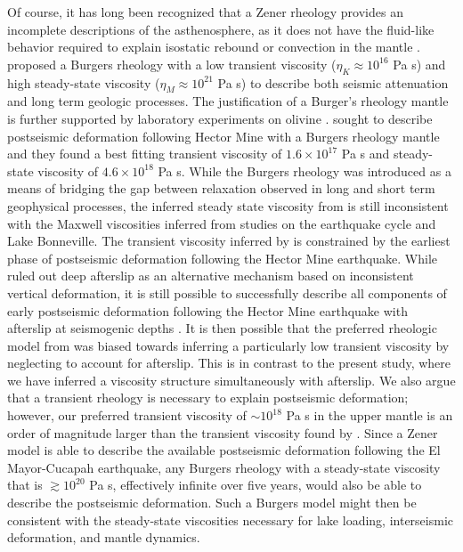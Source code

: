\documentclass[draft,linenumbers]{AGUJournal}
\begin{document}
Of course, it has long been recognized that a Zener rheology provides an incomplete descriptions of the asthenosphere, as it does not have the fluid-like behavior required to explain isostatic rebound or convection in the mantle \citep{OConnell1971}.  \citet{Yuen1982} proposed a Burgers rheology with a low transient viscosity ($\eta_K\approx10^{16}$ Pa s) and high steady-state viscosity ($\eta_M\approx10^{21}$ Pa s) to describe both seismic attenuation and long term geologic processes.  The justification of a Burger's rheology mantle is further supported by laboratory experiments on olivine \citep{Chopra1997}.  \citet{Pollitz2003} sought to describe postseismic deformation following Hector Mine with a Burgers rheology mantle and they found a best fitting transient viscosity of $1.6\times10^{17}$ Pa s and steady-state viscosity of $4.6\times10^{18}$ Pa s. While the Burgers rheology was introduced as a means of bridging the gap between relaxation observed in long and short term geophysical processes, the inferred steady state viscosity from \citet{Pollitz2003} is still inconsistent with the Maxwell viscosities inferred from studies on the earthquake cycle and Lake Bonneville.  The transient viscosity inferred by \citet{Pollitz2003} is constrained by the earliest phase of postseismic deformation following the Hector Mine earthquake. While \citet{Pollitz2003} ruled out deep afterslip as an alternative mechanism based on inconsistent vertical deformation, it is still possible to successfully describe all components of early postseismic deformation following the Hector Mine earthquake with afterslip at seismogenic depths \citep{Jacobs2002}. It is then possible that the preferred rheologic model from \citet{Pollitz2003} was biased towards inferring a particularly low transient viscosity by neglecting to account for afterslip.  This is in contrast to the present study, where we have inferred a viscosity structure simultaneously with afterslip.  We also argue that a transient rheology is necessary to explain postseismic deformation; however, our preferred transient viscosity of ${\sim}10^{18}$ Pa s in the upper mantle is an order of magnitude larger than the transient viscosity found by \citet{Pollitz2003}.  Since a Zener model is able to describe the available postseismic deformation following the El Mayor-Cucapah earthquake, any Burgers rheology with a steady-state viscosity that is $\gtrsim10^{20}$ Pa s, effectively infinite over five years, would also be able to describe the postseismic deformation. Such a Burgers model might then be consistent with the steady-state viscosities necessary for lake loading, interseismic deformation, and mantle dynamics.
\end{document}
